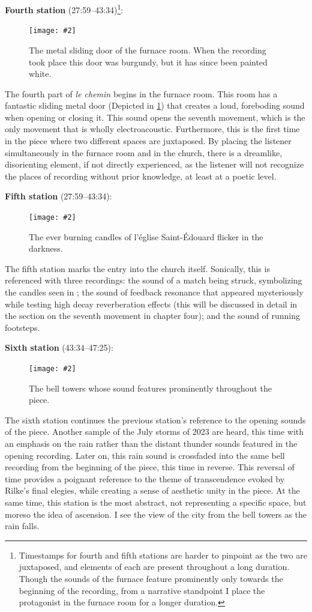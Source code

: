 \documentclass[12pt,twoside,maitrise]{dms_ks}
\newcommand{\customincludegraphics}[4][]{%
    \begin{figure}[H]
        \centering
        \texttt{[image: \#2]}
        \caption{#4}
	\label{#3} 
    \end{figure}
}
\theoremstyle{definition}
\begin{document}
{\textbf{Fourth station} (27:59--43:34)\footnote{Timestamps for fourth and fifth stations are harder to pinpoint as the two are juxtaposed, and elements of each are present throughout a long duration. Though the sounds of the furnace feature prominently only towards the beginning of the recording, from a narrative standpoint I place the protagonist in the furnace room for a longer duration.}:

\customincludegraphics[scale=0.15]{DSC00157.JPG}{fig:station4}{The metal sliding door of the furnace room. When the recording took place this door was burgundy, but it has since been painted white.}%

The fourth part of \textit{le chemin} begins in the furnace room. 
This room has a fantastic sliding metal door (Depicted in \cref{fig:station4}) that creates a loud, foreboding sound when opening or closing it. 
This sound opens the seventh movement, which is the only movement that is wholly electroacoustic. 
Furthermore, this is the first time in the piece where two different spaces are juxtaposed. 
By placing the listener simultaneously in the furnace room and in the church, there is a dreamlike, disorienting element, if not directly experienced, as the listener will not recognize the places of recording without prior knowledge, at least at a poetic level.

\textbf{Fifth station} (27:59--43:34):

\customincludegraphics[scale=0.15]{candles.JPG}{station5}{The ever burning candles of l'église Saint-Édouard flicker in the darkness.}%

The fifth station marks the entry into the church itself. 
Sonically, this is referenced with three recordings: the sound of a match being struck, symbolizing the candles seen in ; the sound of feedback resonance that appeared mysteriously while testing high decay reverberation effects (this will be discussed in detail in the section on the seventh movement in chapter four); and the sound of running footsteps. 

\textbf{Sixth station} (43:34--47:25):

\customincludegraphics[scale=0.15]{eglise_mh.JPG}{station6}{The bell towers whose sound features prominently throughout the piece.}%

The sixth station continues the previous station's reference to the opening sounds of the piece. 
Another sample of the July storms of 2023 are heard, this time with an emphasis on the rain rather than the distant thunder sounds featured in the opening recording. 
Later on, this rain sound is crossfaded into the same bell recording from the beginning of the piece, this time in reverse. 
This reversal of time provides a poignant reference to the theme of transcendence evoked by Rilke's final elegies, while creating a sense of aesthetic unity in the piece.
At the same time, this station is the most abstract, not representing a specific space, but moreso the idea of ascension.
I see the view of the city from the bell towers as the rain falls.

}
\end{document}
